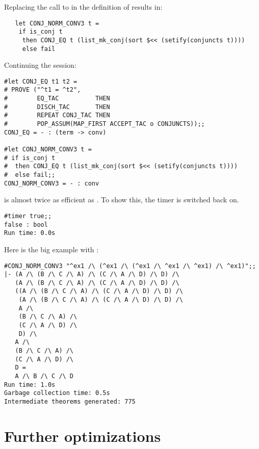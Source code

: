 \noindent Replacing the call to  in the definition
of  results in:

\begin{hol}\begin{verbatim}
   let CONJ_NORM_CONV3 t =
    if is_conj t
     then CONJ_EQ t (list_mk_conj(sort $<< (setify(conjuncts t))))
     else fail
\end{verbatim}\end{hol}

\noindent Continuing the session:

\begin{session}\begin{verbatim}
#let CONJ_EQ t1 t2 =
# PROVE ("^t1 = ^t2",
#        EQ_TAC          THEN
#        DISCH_TAC       THEN
#        REPEAT CONJ_TAC THEN
#        POP_ASSUM(MAP_FIRST ACCEPT_TAC o CONJUNCTS));;
CONJ_EQ = - : (term -> conv)

#let CONJ_NORM_CONV3 t =
# if is_conj t
#  then CONJ_EQ t (list_mk_conj(sort $<< (setify(conjuncts t))))
#  else fail;;
CONJ_NORM_CONV3 = - : conv
\end{verbatim}\end{session}

\noindent {} is almost twice
as efficient as . To show this, the timer is switched
back on.

\begin{session}\begin{verbatim}
#timer true;;
false : bool
Run time: 0.0s
\end{verbatim}\end{session}

\noindent Here is the big example with :

\begin{session}\begin{verbatim}
#CONJ_NORM_CONV3 "^ex1 /\ (^ex1 /\ (^ex1 /\ ^ex1 /\ ^ex1) /\ ^ex1)";;
|- (A /\ (B /\ C /\ A) /\ (C /\ A /\ D) /\ D) /\
   (A /\ (B /\ C /\ A) /\ (C /\ A /\ D) /\ D) /\
   ((A /\ (B /\ C /\ A) /\ (C /\ A /\ D) /\ D) /\
    (A /\ (B /\ C /\ A) /\ (C /\ A /\ D) /\ D) /\
    A /\
    (B /\ C /\ A) /\
    (C /\ A /\ D) /\
    D) /\
   A /\
   (B /\ C /\ A) /\
   (C /\ A /\ D) /\
   D =
   A /\ B /\ C /\ D
Run time: 1.0s
Garbage collection time: 0.5s
Intermediate theorems generated: 775
\end{verbatim}\end{session}

\section{Further optimizations}

